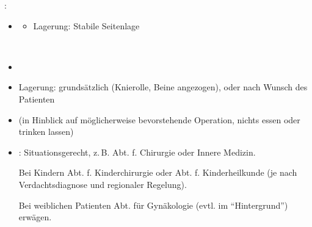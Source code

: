 {
: 

\begin{itemize}
  \item \TxMassVitMKBes
  \begin{itemize}
    \item Lagerung: Stabile Seitenlage
  \end{itemize}
\end{itemize}
}


{\label{m:am-abdominalerkrankungen}}
{
~

\begin{itemize}
  \item {} \TxBeiVit
  \TxMassVitMK
  \item Lagerung: grundsätzlich 
  (Knierolle, Beine angezogen), oder nach Wunsch des Patienten
  \item {} (in Hinblick auf möglicherweise
  bevorstehende Operation, nichts essen oder trinken lassen)
  \item {}: Situationsgerecht,
  z.\,B. Abt. f. Chirurgie oder Innere Medizin.
  
  Bei Kindern Abt. f. Kinderchirurgie oder Abt. f.
  Kinderheilkunde (je nach Verdachtsdiagnose und regionaler
  Regelung).
  
  Bei weiblichen Patienten Abt. für Gynäkologie (evtl. im
  \enquote{Hintergrund}) erwägen.
\end{itemize}
}





